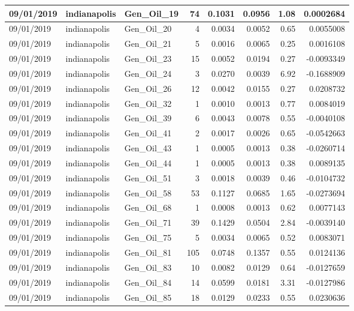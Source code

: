 \documentclass[
  letterpaper,
  DIV=11,
  numbers=noendperiod]{scrartcl}
\begin{document}
\begin{tabular}{l|l|l|r|r|r|r|r}
\hline
09/01/2019 & indianapolis & Gen\_Oil\_19 & 74 & 0.1031 & 0.0956 & 1.08 & 0.0002684\\
\hline
09/01/2019 & indianapolis & Gen\_Oil\_20 & 4 & 0.0034 & 0.0052 & 0.65 & 0.0055008\\
\hline
09/01/2019 & indianapolis & Gen\_Oil\_21 & 5 & 0.0016 & 0.0065 & 0.25 & 0.0016108\\
\hline
09/01/2019 & indianapolis & Gen\_Oil\_23 & 15 & 0.0052 & 0.0194 & 0.27 & -0.0093349\\
\hline
09/01/2019 & indianapolis & Gen\_Oil\_24 & 3 & 0.0270 & 0.0039 & 6.92 & -0.1688909\\
\hline
09/01/2019 & indianapolis & Gen\_Oil\_26 & 12 & 0.0042 & 0.0155 & 0.27 & 0.0208732\\
\hline
09/01/2019 & indianapolis & Gen\_Oil\_32 & 1 & 0.0010 & 0.0013 & 0.77 & 0.0084019\\
\hline
09/01/2019 & indianapolis & Gen\_Oil\_39 & 6 & 0.0043 & 0.0078 & 0.55 & -0.0040108\\
\hline
09/01/2019 & indianapolis & Gen\_Oil\_41 & 2 & 0.0017 & 0.0026 & 0.65 & -0.0542663\\
\hline
09/01/2019 & indianapolis & Gen\_Oil\_43 & 1 & 0.0005 & 0.0013 & 0.38 & -0.0260714\\
\hline
09/01/2019 & indianapolis & Gen\_Oil\_44 & 1 & 0.0005 & 0.0013 & 0.38 & 0.0089135\\
\hline
09/01/2019 & indianapolis & Gen\_Oil\_51 & 3 & 0.0018 & 0.0039 & 0.46 & -0.0104732\\
\hline
09/01/2019 & indianapolis & Gen\_Oil\_58 & 53 & 0.1127 & 0.0685 & 1.65 & -0.0273694\\
\hline
09/01/2019 & indianapolis & Gen\_Oil\_68 & 1 & 0.0008 & 0.0013 & 0.62 & 0.0077143\\
\hline
09/01/2019 & indianapolis & Gen\_Oil\_71 & 39 & 0.1429 & 0.0504 & 2.84 & -0.0039140\\
\hline
09/01/2019 & indianapolis & Gen\_Oil\_75 & 5 & 0.0034 & 0.0065 & 0.52 & 0.0083071\\
\hline
09/01/2019 & indianapolis & Gen\_Oil\_81 & 105 & 0.0748 & 0.1357 & 0.55 & 0.0124136\\
\hline
09/01/2019 & indianapolis & Gen\_Oil\_83 & 10 & 0.0082 & 0.0129 & 0.64 & -0.0127659\\
\hline
09/01/2019 & indianapolis & Gen\_Oil\_84 & 14 & 0.0599 & 0.0181 & 3.31 & -0.0127986\\
\hline
09/01/2019 & indianapolis & Gen\_Oil\_85 & 18 & 0.0129 & 0.0233 & 0.55 & 0.0230636\\

\end{tabular}
\end{document}
